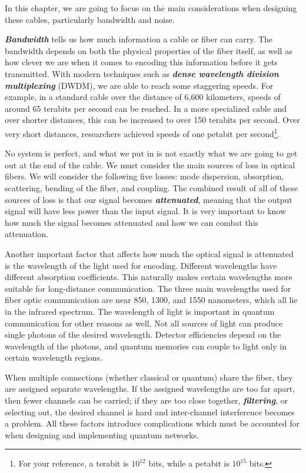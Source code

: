 In this chapter, we are going to focus on the main considerations when designing these cables, particularly bandwidth and noise.

\textbf{\emph{Bandwidth}} tells us how much information a cable or fiber can carry.
The bandwidth depends on both the physical properties of the fiber itself, as well as how clever we are when it comes to encoding this information before it gets transmitted.
With modern techniques such as \textbf{\emph{dense wavelength division multiplexing}} (DWDM), we are able to reach some staggering speeds.
For example, in a standard cable over the distance of 6,600 kilometers, speeds of around 65 terabits per second can be reached.
In a more specialized cable and over shorter distances, this can be increased to over 150 terabits per second.
Over very short distances, researchers achieved speeds of one petabit per second\footnote{For your reference, a terabit is $10^{12}$ bits, while a petabit is $10^{15}$ bits.}.

No system is perfect, and what we put in is not exactly what we are going to get out at the end of the cable.
We must consider the main sources of loss in optical fibers.
We will consider the following five losses: mode dispersion, absorption, scattering, bending of the fiber, and coupling.
The combined result of all of these sources of loss is that our signal becomes \textbf{\emph{attenuated}}, meaning that the output signal will have less power than the input signal.
It is very important to know how much the signal becomes attenuated and how we can combat this attenuation.

Another important factor that affects how much the optical signal is attenuated is the wavelength of the light used for encoding.
Different wavelengths have different absorption coefficients.
This naturally makes certain wavelengths more suitable for long-distance communication.
The three main wavelengths used for fiber optic communication are near 850, 1300, and 1550 nanometers, which all lie in the infrared spectrum.
The wavelength of light is important in quantum communication for other reasons as well.
Not all sources of light can produce single photons of the desired wavelength.
Detector efficiencies depend on the wavelength of the photons, and quantum memories can couple to light only in certain wavelength regions.

When multiple connections (whether classical or quantum) share the fiber, they are assigned separate wavelengths.
If the assigned wavelengths are too far apart, then fewer channels can be carried; if they are too close together, \textbf{\emph{filtering}}, or selecting out, the desired channel is hard and inter-channel interference becomes a problem. 
All these factors introduce complications which must be accounted for when designing and implementing quantum networks.

